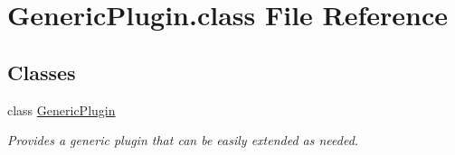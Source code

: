\hypertarget{GenericPlugin_8class}{\section{Generic\-Plugin.\-class File Reference}
\label{GenericPlugin_8class}
}
\subsection*{Classes}
\begin{DoxyCompactItemize}
\item 
class \hyperlink{classGenericPlugin}{Generic\-Plugin}
\begin{DoxyCompactList}\small\item\em Provides a generic plugin that can be easily extended as needed. \end{DoxyCompactList}\end{DoxyCompactItemize}
